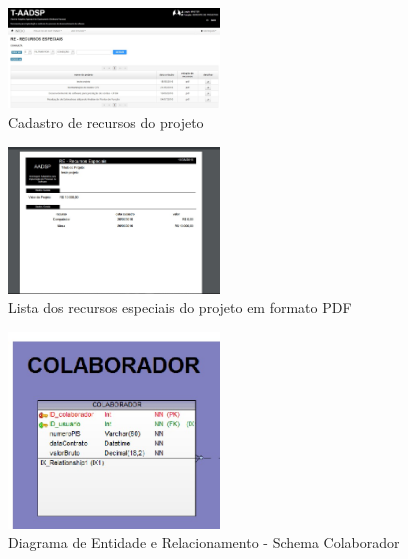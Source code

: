 \documentclass{acm_proc_article-sp}
\begin{document}
\begin{appendices}
\begin{figure}[h]
\centering %
\includegraphics[width=0.5\textwidth]{RF_recursos_especiais_do_projeto.jpg} %
\caption{Cadastro de recursos do projeto}
\end{figure}

\begin{figure}[h]
\centering %
\includegraphics[width=0.5\textwidth]{RF_recursos_especiais_do_projeto_em_PDF.jpg} %
\caption{Lista dos recursos especiais do projeto em formato PDF}
\end{figure}




\begin{figure}[h]
\centering %
\includegraphics[width=0.5\textwidth]{DER_colaborador.jpg} %
\caption{Diagrama de Entidade e Relacionamento - Schema Colaborador}
\end{figure}


\end{appendices}
\end{document}
